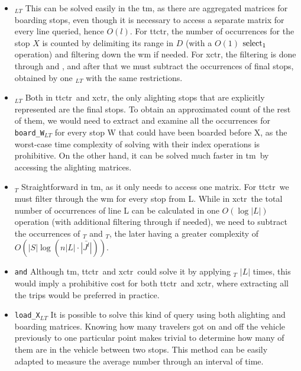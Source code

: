     \begin{itemize}
        \item \texttt{\boardX$_{LT}$} This can be solved easily in the \gls{tm}, as there are aggregated matrices for boarding stops, even though it is necessary to access a separate matrix for every line queried, hence $O(l)$. For \gls{ttctr}, the number of occurrences for the stop $X$ is counted by delimiting its range in $D$ (with a $O(1)$ $\operatorname{select}_1$ operation) and filtering down the \gls{wm} if needed. For \gls{xctr}, the filtering is done through  and , and after that we must subtract the occurrences of final stops, obtained by one \texttt{\endX$_{LT}$} with the same restrictions.
        \item \texttt{\alightX$_{LT}$} Both in \gls{ttctr}~and \gls{xctr}, the only alighting stops that are explicitly represented are the final stops. To obtain an approximated count of the rest of them, we would need to extract and examine all the occurrences for \texttt{board\_W$_{LT}$} for every stop W that could have been boarded before X, as the worst-case time complexity of solving with their index operations is prohibitive. On the other hand, it can be solved much faster in \gls{tm}~by accessing the alighting matrices.
        \item \texttt{\useL$_T$} Straightforward in \gls{tm}, as it only needs to access one matrix. For \gls{ttctr}~we must filter through the \gls{wm} for every stop from L. While in \gls{xctr}~the total number of occurrences of line L can be calculated in one $O(\log|L|)$ operation (with additional filtering through  if needed), we need to subtract the occurrences of \startL$_T$ and \endL$_T$, the later having a greater complexity of $O(|S|\log(n |L|\cdot \bar{|J^l|}))$.
        \item \texttt{\boardT and\alightT} Although \gls{tm}, \gls{ttctr}~and \gls{xctr}~could solve it by applying \useL$_T$ $|L|$ times, this would imply a prohibitive cost for both \gls{ttctr}~and \gls{xctr}, where extracting all the trips would be preferred in practice.
        \item \texttt{load\_X$_{LT}$} It is possible to solve this kind of query using both alighting and boarding matrices. Knowing how many travelers got on and off the vehicle previously to one particular point makes trivial to determine how many of them are in the vehicle between two stops. This method can be easily adapted to measure the average number through an interval of time.

\end{itemize}
